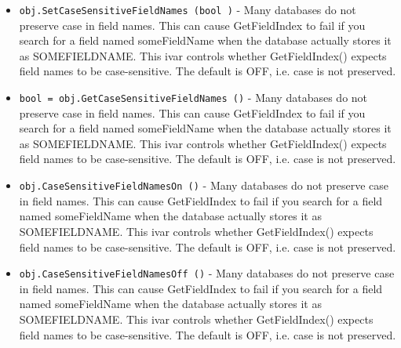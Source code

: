 \begin{itemize}
\item  \verb|obj.SetCaseSensitiveFieldNames (bool )| -  Many databases do not preserve case in field names.  This can
 cause GetFieldIndex to fail if you search for a field named
 someFieldName when the database actually stores it as
 SOMEFIELDNAME.  This ivar controls whether GetFieldIndex()
 expects field names to be case-sensitive.  The default is OFF,
 i.e. case is not preserved.

\item  \verb|bool = obj.GetCaseSensitiveFieldNames ()| -  Many databases do not preserve case in field names.  This can
 cause GetFieldIndex to fail if you search for a field named
 someFieldName when the database actually stores it as
 SOMEFIELDNAME.  This ivar controls whether GetFieldIndex()
 expects field names to be case-sensitive.  The default is OFF,
 i.e. case is not preserved.

\item  \verb|obj.CaseSensitiveFieldNamesOn ()| -  Many databases do not preserve case in field names.  This can
 cause GetFieldIndex to fail if you search for a field named
 someFieldName when the database actually stores it as
 SOMEFIELDNAME.  This ivar controls whether GetFieldIndex()
 expects field names to be case-sensitive.  The default is OFF,
 i.e. case is not preserved.

\item  \verb|obj.CaseSensitiveFieldNamesOff ()| -  Many databases do not preserve case in field names.  This can
 cause GetFieldIndex to fail if you search for a field named
 someFieldName when the database actually stores it as
 SOMEFIELDNAME.  This ivar controls whether GetFieldIndex()
 expects field names to be case-sensitive.  The default is OFF,
 i.e. case is not preserved.

\end{itemize}
